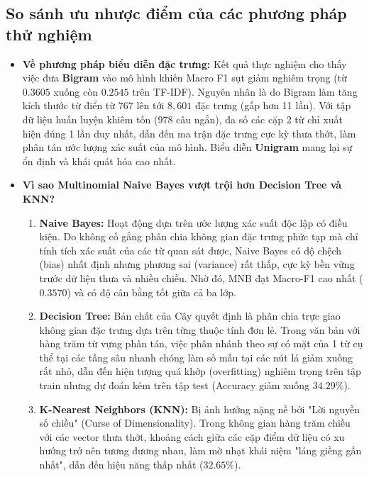 \documentclass[12pt,a4paper]{article}
\begin{document}
\subsection{So sánh ưu nhược điểm của các phương pháp thử nghiệm}
\begin{itemize}
    \item \textbf{Về phương pháp biểu diễn đặc trưng:} 
    Kết quả thực nghiệm cho thấy việc đưa \textbf{Bigram} vào mô hình khiến Macro F1 sụt giảm nghiêm trọng (từ $0.3605$ xuống còn $0.2545$ trên TF-IDF). Nguyên nhân là do Bigram làm tăng kích thước từ điển từ $767$ lên tới $8,601$ đặc trưng (gấp hơn 11 lần). Với tập dữ liệu huấn luyện khiêm tốn ($978$ câu ngắn), đa số các cặp 2 từ chỉ xuất hiện đúng 1 lần duy nhất, dẫn đến ma trận đặc trưng cực kỳ thưa thớt, làm phân tán ước lượng xác suất của mô hình. Biểu diễn \textbf{Unigram} mang lại sự ổn định và khái quát hóa cao nhất.
    
    \item \textbf{Vì sao Multinomial Naive Bayes vượt trội hơn Decision Tree và KNN?}
    \begin{enumerate}
        \item \textbf{Naive Bayes:} Hoạt động dựa trên ước lượng xác suất độc lập có điều kiện. Do không cố gắng phân chia không gian đặc trưng phức tạp mà chỉ tính tích xác suất của các từ quan sát được, Naive Bayes có độ chệch (bias) nhất định nhưng phương sai (variance) rất thấp, cực kỳ bền vững trước dữ liệu thưa và nhiều chiều. Nhờ đó, MNB đạt Macro-F1 cao nhất ($0.3570$) và có độ cân bằng tốt giữa cả ba lớp.
        \item \textbf{Decision Tree:} Bản chất của Cây quyết định là phân chia trực giao không gian đặc trưng dựa trên từng thuộc tính đơn lẻ. Trong văn bản với hàng trăm từ vựng phân tán, việc phân nhánh theo sự có mặt của 1 từ cụ thể tại các tầng sâu nhanh chóng làm số mẫu tại các nút lá giảm xuống rất nhỏ, dẫn đến hiện tượng quá khớp (overfitting) nghiêm trọng trên tập train nhưng dự đoán kém trên tập test (Accuracy giảm xuống $34.29\%$).
        \item \textbf{K-Nearest Neighbors (KNN):} Bị ảnh hưởng nặng nề bởi "Lời nguyền số chiều" (Curse of Dimensionality). Trong không gian hàng trăm chiều với các vector thưa thớt, khoảng cách giữa các cặp điểm dữ liệu có xu hướng trở nên tương đương nhau, làm mờ nhạt khái niệm "láng giềng gần nhất", dẫn đến hiệu năng thấp nhất ($32.65\%$).
    \end{enumerate}
\end{itemize}
\end{document}
